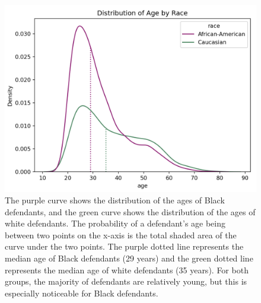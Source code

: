 \documentclass[water,article,submit,moreauthors,pdftex]{mdpi}
\begin{document}
\begin{figure}

{\centering \includegraphics[width=1\linewidth]{../images/age_race_plot_new} 

}

\caption{The purple curve shows the distribution of the ages of Black defendants, and the green curve shows the distribution of the ages of white defendants. The probability of a defendant's age being between two points on the x-axis is the total shaded area of the curve under the two points. The purple dotted line represents the median age of Black defendants (29 years) and the green dotted line represents the median age of white defendants (35 years). For both groups, the majority of defendants are relatively young, but this is especially noticeable for Black defendants.}\label{fig:age plot}
\end{figure}
\end{document}
